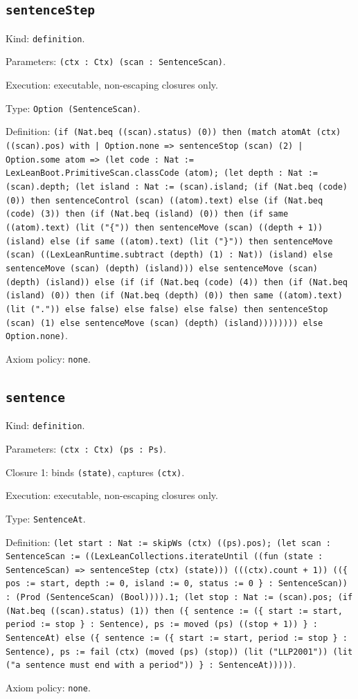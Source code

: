 \documentclass[11pt]{article}
\begin{document}
\subsection*{\texttt{sentenceStep}}
\noindent Kind: \texttt{definition}.\par
\noindent Parameters: \texttt{(ctx : Ctx) (scan : SentenceScan)}.\par
\noindent Execution: executable, non-escaping closures only.\par
\noindent Type: \texttt{Option (SentenceScan)}.\par
\noindent Definition: \texttt{(if (Nat.beq ((scan).status) (0)) then (match atomAt (ctx) ((scan).pos) with | Option.none => sentenceStop (scan) (2) | Option.some atom => (let code : Nat := LexLeanBoot.PrimitiveScan.classCode (atom); (let depth : Nat := (scan).depth; (let island : Nat := (scan).island; (if (Nat.beq (code) (0)) then sentenceControl (scan) ((atom).text) else (if (Nat.beq (code) (3)) then (if (Nat.beq (island) (0)) then (if same ((atom).text) (lit ("\{")) then sentenceMove (scan) ((depth + 1)) (island) else (if same ((atom).text) (lit ("\}")) then sentenceMove (scan) ((LexLeanRuntime.subtract (depth) (1) : Nat)) (island) else sentenceMove (scan) (depth) (island))) else sentenceMove (scan) (depth) (island)) else (if (if (Nat.beq (code) (4)) then (if (Nat.beq (island) (0)) then (if (Nat.beq (depth) (0)) then same ((atom).text) (lit (".")) else false) else false) else false) then sentenceStop (scan) (1) else sentenceMove (scan) (depth) (island)))))))) else Option.none)}.\par
\noindent Axiom policy: \texttt{none}.\par
\subsection*{\texttt{sentence}}
\noindent Kind: \texttt{definition}.\par
\noindent Parameters: \texttt{(ctx : Ctx) (ps : Ps)}.\par
\noindent Closure 1: binds \texttt{(state)}, captures \texttt{(ctx)}.\par
\noindent Execution: executable, non-escaping closures only.\par
\noindent Type: \texttt{SentenceAt}.\par
\noindent Definition: \texttt{(let start : Nat := skipWs (ctx) ((ps).pos); (let scan : SentenceScan := ((LexLeanCollections.iterateUntil ((fun (state : SentenceScan) => sentenceStep (ctx) (state))) (((ctx).count + 1)) ((\{ pos := start, depth := 0, island := 0, status := 0 \} : SentenceScan)) : (Prod (SentenceScan) (Bool)))).1; (let stop : Nat := (scan).pos; (if (Nat.beq ((scan).status) (1)) then (\{ sentence := (\{ start := start, period := stop \} : Sentence), ps := moved (ps) ((stop + 1)) \} : SentenceAt) else (\{ sentence := (\{ start := start, period := stop \} : Sentence), ps := fail (ctx) (moved (ps) (stop)) (lit ("LLP2001")) (lit ("a sentence must end with a period")) \} : SentenceAt)))))}.\par
\noindent Axiom policy: \texttt{none}.\par
\end{document}
